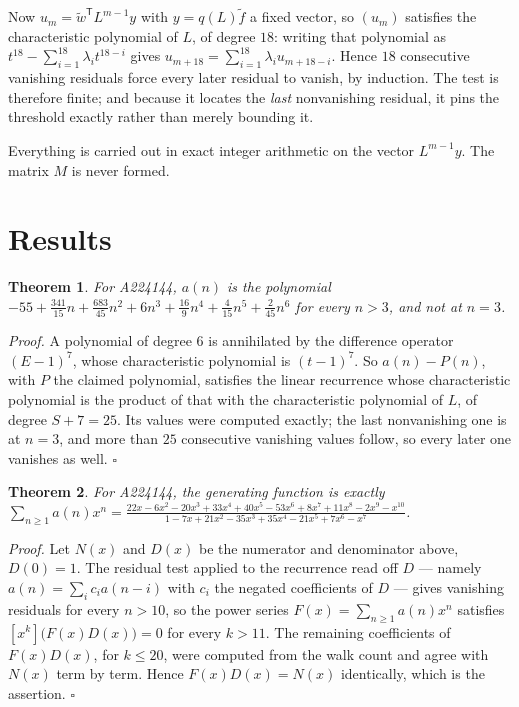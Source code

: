 \documentclass[11pt]{article}
\newtheorem{theorem}{Theorem}
\theoremstyle{definition}
\begin{document}
Now $u_m = \tilde w^{\mathsf T} L^{m-1} y$ with $y = q(L)\tilde f$ a fixed vector, so $(u_m)$ satisfies the characteristic polynomial of $L$, of degree $18$: writing that polynomial as $t^{18} - \sum_{i=1}^{18} \lambda_i t^{18-i}$ gives $u_{m+18} = \sum_{i=1}^{18} \lambda_i u_{m+18-i}$. Hence $18$ consecutive vanishing residuals force every later residual to vanish, by induction. The test is therefore finite; and because it locates the {\itshape last} nonvanishing residual, it pins the threshold exactly rather than merely bounding it.

Everything is carried out in exact integer arithmetic on the vector $L^{m-1}y$. The matrix $M$ is never formed.

\section{Results}

\begin{theorem} For A224144, $a(n)$ is the polynomial $-55 + \frac{341}{15}n + \frac{683}{45}n^{2} + 6n^{3} + \frac{16}{9}n^{4} + \frac{4}{15}n^{5} + \frac{2}{45}n^{6}$ for every $n > 3$, and not at $n = 3$.\end{theorem}

{\itshape Proof.} A polynomial of degree $6$ is annihilated by the difference operator $(E-1)^{7}$, whose characteristic polynomial is $(t-1)^{7}$. So $a(n) - P(n)$, with $P$ the claimed polynomial, satisfies the linear recurrence whose characteristic polynomial is the product of that with the characteristic polynomial of $L$, of degree $S + 7 = 25$. Its values were computed exactly; the last nonvanishing one is at $n = 3$, and more than $25$ consecutive vanishing values follow, so every later one vanishes as well. $\square$

\begin{theorem} For A224144, the generating function is exactly $\sum_{n\ge 1} a(n)x^n = \frac{22x - 6x^{2} - 20x^{3} + 33x^{4} + 40x^{5} - 53x^{6} + 8x^{7} + 11x^{8} - 2x^{9} - x^{10}}{1 - 7x + 21x^{2} - 35x^{3} + 35x^{4} - 21x^{5} + 7x^{6} - x^{7}}$.\end{theorem}

{\itshape Proof.} Let $N(x)$ and $D(x)$ be the numerator and denominator above, $D(0)=1$. The residual test applied to the recurrence read off $D$ --- namely $a(n) = \sum_i c_i a(n-i)$ with $c_i$ the negated coefficients of $D$ --- gives vanishing residuals for every $n > 10$, so the power series $F(x)=\sum_{n\ge 1}a(n)x^n$ satisfies $[x^k]\bigl(F(x)D(x)\bigr) = 0$ for every $k > 11$. The remaining coefficients of $F(x)D(x)$, for $k \le 20$, were computed from the walk count and agree with $N(x)$ term by term. Hence $F(x)D(x) = N(x)$ identically, which is the assertion. $\square$
\end{document}
